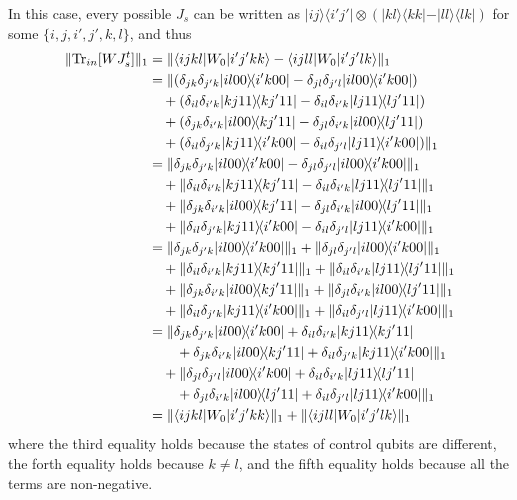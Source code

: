 \documentclass[a4paper,twocolumn,accepted=2022-10-23]{quantumarticle}
\newcommand{\bra}[1]{\langle {#1} \vert}
\newcommand{\ket}[1]{\vert {#1} \rangle}
\newcommand{\ketbra}[2]{\vert {#1} \rangle\!\langle {#2} \vert}
\newcommand{\Tr}[0]{{\mathrm{Tr}}}
\theoremstyle{definition}
\begin{document}
In this case, every possible $J_s$ can be written as $\ketbra{ij}{i'j'} \otimes (\ketbra{kl}{kk} - \ketbra{ll}{lk})$ for some $\{ i,j,i',j',k,l\}$, and thus
\begin{align}
\| \Tr_{in} [W J_s^t] \|_1 %
&=  \| \bra{ijkl} {W_0} \ket{i'j'kk} - \bra{ijll} {W_0} \ket{i'j'lk}  \|_1 \\
&= \| (\delta_{jk}\delta_{j'k} \ketbra{il00}{i'k00} - \delta_{jl}\delta_{j'l} \ketbra{il00}{i'k00}) \notag \\
&\quad+ (\delta_{il}\delta_{i'k} \ketbra{kj11}{kj'11} - \delta_{il}\delta_{i'k} \ketbra{lj11}{lj'11}) \notag \\
&\quad+ (\delta_{jk}\delta_{i'k} \ketbra{il00}{kj'11} - \delta_{jl}\delta_{i'k} \ketbra{il00}{lj'11} ) \notag \\
&\quad+ (\delta_{il}\delta_{j'k} \ketbra{kj11}{i'k00} - \delta_{il}\delta_{j'l} \ketbra{lj11}{i'k00}) \|_1 \\
&= \| \delta_{jk}\delta_{j'k} \ketbra{il00}{i'k00} - \delta_{jl}\delta_{j'l} \ketbra{il00}{i'k00} \|_1 \notag \\
&\quad+ \| \delta_{il}\delta_{i'k} \ketbra{kj11}{kj'11} - \delta_{il}\delta_{i'k} \ketbra{lj11}{lj'11} \|_1 \notag \\
&\quad+ \| \delta_{jk}\delta_{i'k} \ketbra{il00}{kj'11} - \delta_{jl}\delta_{i'k} \ketbra{il00}{lj'11} \|_1 \notag \\
&\quad+ \| \delta_{il}\delta_{j'k} \ketbra{kj11}{i'k00} - \delta_{il}\delta_{j'l} \ketbra{lj11}{i'k00} \|_1 \\
&= \| \delta_{jk}\delta_{j'k} \ketbra{il00}{i'k00} \|_1 + \| \delta_{jl}\delta_{j'l} \ketbra{il00}{i'k00} \|_1 \notag \\
&\quad+ \| \delta_{il}\delta_{i'k} \ketbra{kj11}{kj'11} \|_1 + \| \delta_{il}\delta_{i'k} \ketbra{lj11}{lj'11} \|_1 \notag \\
&\quad+ \| \delta_{jk}\delta_{i'k} \ketbra{il00}{kj'11} \|_1 + \| \delta_{jl}\delta_{i'k} \ketbra{il00}{lj'11} \|_1 \notag \\
&\quad+ \| \delta_{il}\delta_{j'k} \ketbra{kj11}{i'k00} \|_1 + \| \delta_{il}\delta_{j'l} \ketbra{lj11}{i'k00} \|_1 \\
&= \| \delta_{jk}\delta_{j'k} \ketbra{il00}{i'k00} + \delta_{il}\delta_{i'k} \ketbra{kj11}{kj'11}  \notag \\
&\qquad+  \delta_{jk}\delta_{i'k} \ketbra{il00}{kj'11} + \delta_{il}\delta_{j'k} \ketbra{kj11}{i'k00} \|_1 \notag \\
&\quad+ \| \delta_{jl}\delta_{j'l} \ketbra{il00}{i'k00} + \delta_{il}\delta_{i'k} \ketbra{lj11}{lj'11} \notag \\
&\qquad+ \delta_{jl}\delta_{i'k} \ketbra{il00}{lj'11} + \delta_{il}\delta_{j'l} \ketbra{lj11}{i'k00} \|_1 \\
&= \| \bra{ijkl} {W_0} \ket{i'j'kk} \|_1 + \| \bra{ijll} {W_0} \ket{i'j'lk}  \|_1 \\
\end{align}
where the third equality holds because the states of control qubits are different,
the forth equality holds because $k \neq l$,
and the fifth equality holds because all the terms are non-negative.
\end{document}
